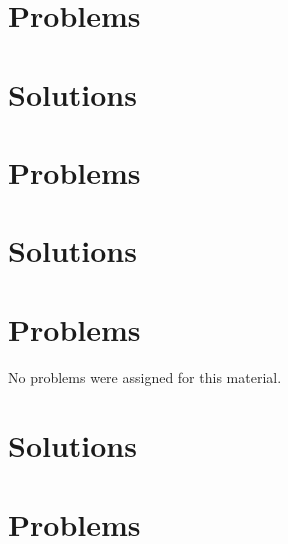    \section{Problems}
      
   \section{Solutions}
      \shipoutAnswer

   
   
   
   
   
   

   \section{Problems}
      
      
      
      
      
      
      
      
   \section{Solutions}
      \shipoutAnswer

   
   \section{Problems}
      No problems were assigned for this material.
   \section{Solutions}
      \shipoutAnswer

   
   
   \section{Problems}
      
      
